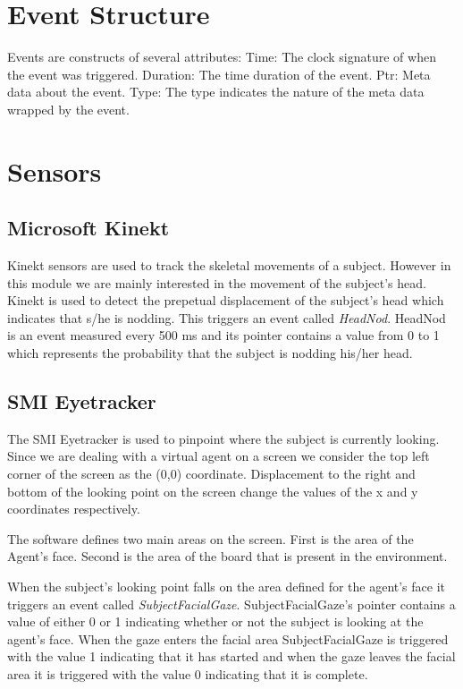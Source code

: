 \documentclass[12pt, a4paper, fleqn]{memoir}%
\begin{document}
\section{Event Structure}
Events are constructs of several attributes:
Time:
The clock signature of when the event was triggered.
Duration:
The time duration of the event.
Ptr:
Meta data about the event.
Type:
The type indicates the nature of the meta data wrapped by the event.

\section{Sensors}
\label{sec:Sensors}

\subsection{Microsoft Kinekt}
Kinekt sensors are used to track the skeletal movements of a subject. However in this module we are mainly interested in the movement of the subject's head. Kinekt is used to detect the prepetual displacement of the subject's head which indicates that s/he is nodding. This triggers an event called \textit{HeadNod}. HeadNod is an event measured every 500 ms and its pointer contains a value from 0 to 1 which represents the probability that the subject is nodding his/her head.

\subsection{SMI Eyetracker}
The SMI Eyetracker is used to pinpoint where the subject is currently looking. Since we are dealing with a virtual agent on a screen we consider the top left corner of the screen as the (0,0) coordinate. Displacement to the right and bottom of the looking point on the screen change the values of the x and y coordinates respectively.

The software defines two main areas on the screen. First is the area of the Agent's face. Second is the area of the board that is present in the environment.

When the subject's looking point falls on the area defined for the agent's face it triggers an event called \textit{SubjectFacialGaze}. SubjectFacialGaze's pointer contains a value of either 0 or 1 indicating whether or not the subject is looking at the agent's face. When the gaze enters the facial area SubjectFacialGaze is triggered with the value 1 indicating that it has started and when the gaze leaves the facial area it is triggered with the value 0 indicating that it is complete.
\end{document}
